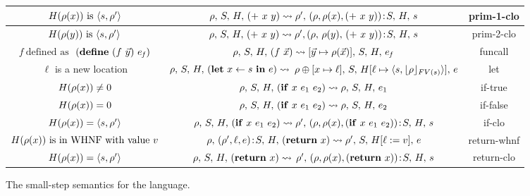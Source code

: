 \documentclass[preprint,9pt]{sigplanconf}
\newcommand{\comment}[1]{{\color{Myblue}{#1}}}
\def\myvec{\mathaccent"017E }
\begin{document}
\begin{figure*}[t!]
\begin{center}
\begin{tabular}{|c|c|c|}
$H(\rho(x)) \mbox{ is } \langle s, \rho'\rangle$ & $\rho,\, S,\, H,\, (+~x~y)
\rightsquigarrow
\rho',\, (\rho, \rho(x), (+~x~y))\!:\!S,\, H,\, s$      &
{\sc prim-1-clo} \\
\hline
$H(\rho(y)) \mbox{ is } \langle s, \rho'\rangle $ & $\rho,\, S,\, H,\, (+~x~y)
\rightsquigarrow
\rho', (\rho,\, \rho(y),\, (+~x~y))\!:\!S,\, H,\, s$      &
{\sc prim-2-clo} \\
\hline
{$\mathit{f}~\mbox{defined as}$
$~(\DEFINE~(f~\myvec{y})~e_{\mathit{f}})$}  & $\rho,\, S,\, \heap,\,
(f~\myvec{x})  \rightsquigarrow
[\myvec{y} \mapsto \rho(\myvec{x})],\, S,\, \heap,\, e_{\mathit{f}}$      &
{\sc funcall} \\
\hline
$\ell$ is a new location& {$\rho,\, S,\, H,\, (\mbox{$\mathbf{ let}$}~x\leftarrow s~\mbox{$\mathbf{ in}$}~e)
  \rightsquigarrow$
$\rho\oplus[x \mapsto \ell],\, S,\, \heap[\ell \mapsto \langle s,
    \lfloor\rho\rfloor_{FV(s)} %
    \rangle],\, e$} &
{\sc let} \\
\hline
$H(\rho(x)) \ne 0$ & $\rho,\, S,\, H,\, (\mbox{$\mathbf{ if}$}~x~e_1~e_2)   \rightsquigarrow
\rho,\, S,\, H,\,  e_1$ & {\sc if-true} \\
\hline
$H(\rho(x)) = 0$ & $\rho,\, S,\, H,\, (\mbox{$\mathbf{ if}$}~x~e_1~e_2)   \rightsquigarrow
\rho,\, S, \,H, \, e_2$ & {\sc if-false} \\
\hline
$H(\rho(x)) = \langle s, \rho' \rangle $ & {$\rho,\, S,\, H,\,
  (\mbox{$\mathbf{ if}$}~x~e_1~e_2)   \rightsquigarrow
\rho',\, (\rho, \rho(x), (\mbox{$\mathbf{ if}$}~x~e_1~e_2))\!:\!S,\, H, \, s$}
&
{\sc if-clo} \\
\hline
{$H(\rho(x))~\mbox{is in WHNF with value}~v$}& $\rho,\, (\rho', \ell,
e)\!:\!S,\, H,\,
(\mbox{$\mathbf{ return}$}~x)  \rightsquigarrow \rho',\, S,\, H[\ell := v],\, e$ &
{\sc return-whnf}\\
\hline
$H(\rho(x)) = \langle s, \rho' \rangle $ & {$\rho,\, S,\, H,\, (\mbox{$\mathbf{ return}$}~x)
  \rightsquigarrow$
$\rho',\, (\rho, \rho(x), (\mbox{$\mathbf{ return}$}~x))\!:\!S,\, H,\,  s$} &
{\sc return-clo} \\
\hline
\end{tabular}
\caption{The small-step semantics for the language. \label{fig:lang-semantics}}
\end{center}
\end{figure*}
\end{document}
